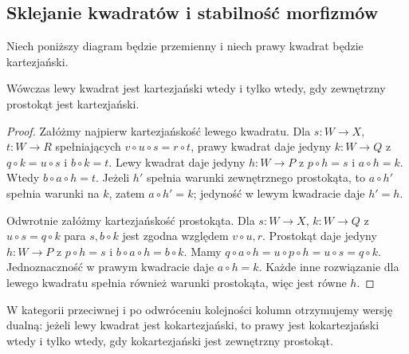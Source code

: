 \subsection{Sklejanie kwadratów i stabilność morfizmów}

\begin{twierdzenie}\label{cat:thm:pullback-pasting}
Niech poniższy diagram będzie przemienny i niech prawy kwadrat będzie kartezjański.
\begin{center}
\end{center}
Wówczas lewy kwadrat jest kartezjański wtedy i tylko wtedy, gdy zewnętrzny prostokąt jest kartezjański.
\end{twierdzenie}
\begin{proof}
Załóżmy najpierw kartezjańskość lewego kwadratu. Dla $s:W\to X$, $t:W\to R$ spełniających $v\circ u\circ s=r\circ t$, prawy kwadrat daje jedyny $k:W\to Q$ z $q\circ k=u\circ s$ i $b\circ k=t$. Lewy kwadrat daje jedyny $h:W\to P$ z $p\circ h=s$ i $a\circ h=k$. Wtedy $b\circ a\circ h=t$. Jeżeli $h'$ spełnia warunki zewnętrznego prostokąta, to $a\circ h'$ spełnia warunki na $k$, zatem $a\circ h'=k$; jedyność w lewym kwadracie daje $h'=h$.

Odwrotnie załóżmy kartezjańskość prostokąta. Dla $s:W\to X$, $k:W\to Q$ z $u\circ s=q\circ k$ para $s,b\circ k$ jest zgodna względem $v\circ u,r$. Prostokąt daje jedyny $h:W\to P$ z $p\circ h=s$ i $b\circ a\circ h=b\circ k$. Mamy $q\circ a\circ h=u\circ p\circ h=u\circ s=q\circ k$. Jednoznaczność w prawym kwadracie daje $a\circ h=k$. Każde inne rozwiązanie dla lewego kwadratu spełnia również warunki prostokąta, więc jest równe $h$.
\end{proof}

\begin{uwaga}
W kategorii przeciwnej i po odwróceniu kolejności kolumn otrzymujemy wersję dualną: jeżeli lewy kwadrat jest kokartezjański, to prawy jest kokartezjański wtedy i tylko wtedy, gdy kokartezjański jest zewnętrzny prostokąt.
\end{uwaga}

